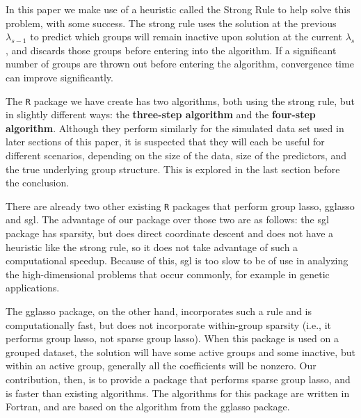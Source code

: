 \documentclass[12pt]{article}
\newcommand{\pkg}[1]{{\normalfont\fontseries{b}\selectfont #1}}
\begin{document}
In this paper we make use of a heuristic called the Strong Rule \citep{tibshirani2012strong} to help solve this problem, with some success. The strong rule uses the solution at the previous $\lambda_{s-1}$ to predict which groups will remain inactive upon solution at the current $\lambda_s$, and discards those groups before entering into the algorithm. If a significant number of groups are thrown out before entering the algorithm, convergence time can improve significantly.

The \texttt{R} package we have create has two algorithms, both using the strong rule, but in slightly different ways: the \textbf{three-step algorithm} and the \textbf{four-step algorithm}. Although they perform similarly for the simulated data set used in later sections of this paper, it is suspected that they will each be useful for different scenarios, depending on the size of the data, size of the predictors, and the true underlying group structure. This is explored in the last section before the conclusion.


There are already two other existing \texttt{R} packages that perform group lasso, \pkg{gglasso} and \pkg{sgl}. The advantage of our package over those two are as follows: the sgl package has sparsity, but does direct coordinate descent and does not have a heuristic like the strong rule, so it does not take advantage of such a computational speedup. Because of this, \pkg{sgl} is too slow to be of use in analyzing the high-dimensional problems that occur commonly, for example in genetic applications.

The \pkg{gglasso} package, on the other hand, incorporates such a rule and is computationally fast, but does not incorporate within-group sparsity (i.e., it performs group lasso, not sparse group lasso). When this package is used on a grouped dataset, the solution will have some active groups and some inactive, but within an active group, generally all the coefficients will be nonzero. Our contribution, then, is to provide a package that performs sparse group lasso, and is faster than existing algorithms. The algorithms for this package are written in Fortran, and are based on the algorithm from the gglasso package.
\end{document}
